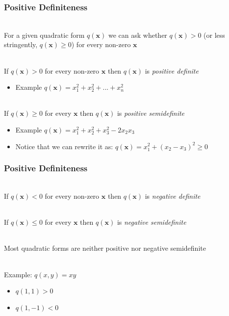 \documentclass[handout]{beamer}
\numberwithin{equation}{section}
\begin{document}
\begin{frame}
\frametitle{Positive Definiteness}

\ \\For a given quadratic form $q(\mathbf{x})$ we can ask whether $q(\mathbf{x})>0$ (or less stringently, $q(\mathbf{x})\geq 0$) for every non-zero $\mathbf{x}$ \pause

\ \\If  $q(\mathbf{x})>0$ for every non-zero $\mathbf{x}$ then $q(\mathbf{x})$ is \textit{positive definite} \pause

\begin{itemize}
\item Example $q(\mathbf{x}) = x_1^2+x_2^2+...+x_n^2$
\end{itemize} \pause

\ \\If  $q(\mathbf{x})\geq 0$ for every $\mathbf{x}$ then $q(\mathbf{x})$ is \textit{positive semidefinite} \pause

\begin{itemize}
\item Example $q(\mathbf{x}) = x_1^2+x_2^2+x_3^2-2x_2x_3$ \pause
\item Notice that we can rewrite it as: $q(\mathbf{x}) = x_1^2+(x_2-x_3)^2 \geq 0$
\end{itemize}

\end{frame}



\begin{frame}
\frametitle{Positive Definiteness}

\ \\If  $q(\mathbf{x})<0$ for every non-zero $\mathbf{x}$ then $q(\mathbf{x})$ is \textit{negative definite} \pause

\ \\If  $q(\mathbf{x})\leq 0$ for every $\mathbf{x}$ then $q(\mathbf{x})$ is \textit{negative semidefinite} \pause

\ \\Most  quadratic forms are neither positive nor negative semidefinite \pause

\ \\Example: $q(x, y)=xy$
\begin{itemize}
\item $q(1, 1)>0$
\item $q(1, -1)<0$
\end{itemize}

\end{frame}
\end{document}
